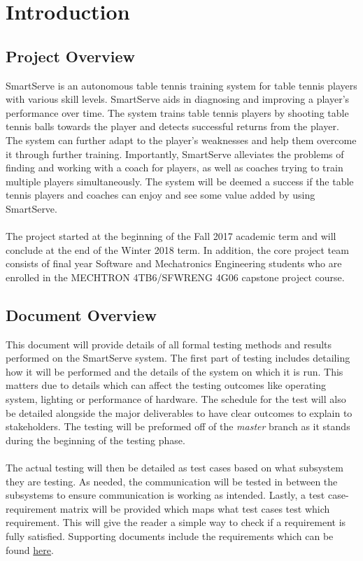 \documentclass[11pt]{article}
\begin{document}
\section{Introduction}
\subsection{Project Overview}
SmartServe is an autonomous table tennis training system for table tennis players with various skill levels. SmartServe aids in diagnosing and improving a player's performance over time. The system trains table tennis players by shooting table tennis balls towards the player and detects successful returns from the player. The system can further adapt to the player's weaknesses and help them overcome it through further training. Importantly, SmartServe alleviates the problems of finding and working with a coach for players, as well as coaches trying to train multiple players simultaneously. The system will be deemed a success if the table tennis players and coaches can enjoy and see some value added by using SmartServe.\\\\
The project started at the beginning of the Fall 2017 academic term and will conclude at the end of the Winter 2018 term. In addition, the core project team consists of final year Software and Mechatronics Engineering students who are enrolled in the MECHTRON 4TB6/SFWRENG 4G06 capstone project course.
\subsection{Document Overview}
This document will provide details of all formal testing methods and results performed on the SmartServe system. The first part of testing includes detailing how it will be performed and the details of the system on which it is run. This matters due to details which can affect the testing outcomes like operating system, lighting or performance of hardware. The schedule for the test will also be detailed alongside the major deliverables to have clear outcomes to explain to stakeholders. The testing will be preformed off of the \textit{master} branch as it stands during the beginning of the testing phase. \\ \\
The actual testing will then be detailed as test cases based on what subsystem they are testing. As needed, the communication will be tested in between the subsystems to ensure communication is working as intended. Lastly, a test case-requirement matrix will be provided which maps what test cases test which requirement. This will give the reader a simple way to check if a requirement is fully satisfied. Supporting documents include the requirements which can be found \href{https://github.com/ChristopherMcDonald/SoftwareTronCapstone/blob/develop/documentation/Requirements/Requirements.pdf}{here}.
\end{document}
